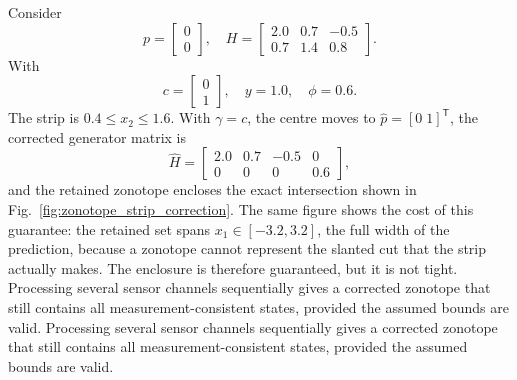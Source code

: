 \documentclass[graybox,envcountchap]{style/SNmono}
\providecommand{\DIFdel}[1]{{\protect\color{red} #1}} %
\providecommand{\DIFdelbegin}{} %
\providecommand{\DIFdelend}{} %
\begin{document}
\begin{example}
\label{ex:zonotope-strip}
Consider
\begin{equation}
p=
\begin{bmatrix}
0\\
0
\end{bmatrix},
\quad
H=
\begin{bmatrix}
2.0 & 0.7 & -0.5\\
0.7 & 1.4 & 0.8
\end{bmatrix}.
\end{equation}
With
\begin{equation}
c=
\begin{bmatrix}
0\\
1
\end{bmatrix},
\quad
y=1.0,\quad
\phi=0.6.
\end{equation}
The strip is $0.4\le x_2\le1.6$. With $\gamma=c$, the centre moves to $\hat p=[0\;1]^{\mathsf T}$, the corrected generator matrix is
\begin{equation}
\hat H=
\begin{bmatrix}
2.0 & 0.7 & -0.5 & 0\\
0 & 0 & 0 & 0.6
\end{bmatrix},
\end{equation}
and the retained zonotope encloses the exact intersection shown in Fig.~\ref{fig:zonotope_strip_correction}. The same figure shows the cost of this guarantee: the retained set spans $x_1\in[-3.2,3.2]$, the full width of the prediction, because a zonotope cannot represent the slanted cut that the strip actually makes. The enclosure is therefore guaranteed, but it is not tight. Processing several sensor channels sequentially gives a corrected zonotope that still contains all measurement-consistent states, provided the assumed bounds are valid.
\DIFdelbegin \DIFdel{Processing several sensor channels sequentially gives a corrected zonotope that still contains all measurement-consistent states, provided the assumed bounds are valid.
}\DIFdelend \end{example}
\end{document}
